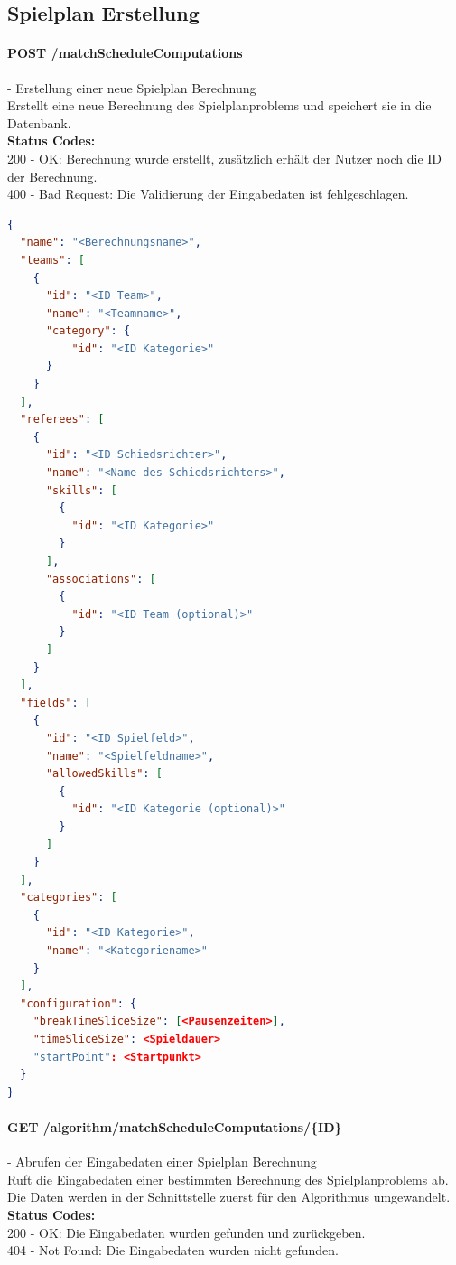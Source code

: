 %
%
%
%

\subsection{Spielplan Erstellung}

\paragraph{POST /matchScheduleComputations} - Erstellung einer neue Spielplan Berechnung\mbox{}\\
Erstellt eine neue Berechnung des Spielplanproblems und speichert sie in die Datenbank.\\
\textbf{Status Codes:}\\
200 - OK: Berechnung wurde erstellt, zusätzlich erhält der Nutzer noch die ID der Berechnung.\\
400 - Bad Request: Die Validierung der Eingabedaten ist fehlgeschlagen.\\

\begin{lstlisting}[language=JSON, caption=Beispiel einer Eingabe für das Spielplanproblem, label=lst:input_matchScheduling]  
{
  "name": "<Berechnungsname>",
  "teams": [
    {
      "id": "<ID Team>",
      "name": "<Teamname>",
      "category": {
          "id": "<ID Kategorie>"
      }
    }
  ],
  "referees": [
    {
      "id": "<ID Schiedsrichter>",
      "name": "<Name des Schiedsrichters>",
      "skills": [
        {
          "id": "<ID Kategorie>"
        }
      ],
      "associations": [
        {
          "id": "<ID Team (optional)>"
        }
      ]
    }
  ],
  "fields": [
    {
      "id": "<ID Spielfeld>",
      "name": "<Spielfeldname>",
      "allowedSkills": [
        {
          "id": "<ID Kategorie (optional)>"
        }
      ]
    }
  ],
  "categories": [
    {
      "id": "<ID Kategorie>",
      "name": "<Kategoriename>"
    }
  ],
  "configuration": {
    "breakTimeSliceSize": [<Pausenzeiten>],
    "timeSliceSize": <Spieldauer>
    "startPoint": <Startpunkt>
  }
}
\end{lstlisting}

\paragraph{GET /algorithm/matchScheduleComputations/\{ID\}} - Abrufen der Eingabedaten einer Spielplan Berechnung\mbox{}\\
Ruft die Eingabedaten einer bestimmten Berechnung des Spielplanproblems ab. Die Daten werden in der Schnittstelle zuerst für den Algorithmus umgewandelt.\\
\textbf{Status Codes:}\\
200 - OK: Die Eingabedaten wurden gefunden und zurückgeben.\\
404 - Not Found: Die Eingabedaten wurden nicht gefunden.\\

